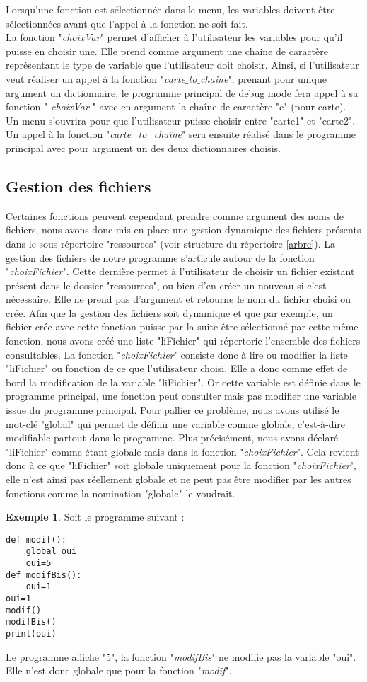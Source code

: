 \documentclass[10pt,a4paper,french,titlepage]{article}
\theoremstyle{definition}
\newtheorem{exmp}{Exemple}
\begin{document}
Lorsqu'une fonction est sélectionnée dans le menu, les variables doivent être sélectionnées avant que l'appel à la fonction ne soit fait.\\ La fonction "\textit{choixVar}" permet d'afficher à l'utilisateur les variables pour qu'il puisse en choisir une. Elle prend comme argument une chaine de caractère représentant le type de variable que l'utilisateur doit choisir. Ainsi, si l'utilisateur veut réaliser un appel à la fonction "\textit{carte$\_$to$\_$chaine}", prenant pour unique argument un dictionnaire, le programme principal de debug$\_$mode fera appel à sa fonction " \textit{choixVar} " avec en argument la chaîne de caractère "c" (pour carte). Un menu s'ouvrira pour que l'utilisateur puisse choisir entre "carte1" et "carte2". Un appel à la fonction "\textit{carte\_to\_chaîne}" sera ensuite réalisé dans le programme principal avec pour argument un des deux dictionnaires choisis.


\subsection{Gestion des fichiers}
Certaines fonctions peuvent cependant prendre comme argument des noms de fichiers, nous avons donc mis en place une gestion dynamique des fichiers présents dans le sous-répertoire "ressources" (voir structure du répertoire \ref{arbre}). La gestion des fichiers de notre programme s'articule autour de la fonction "\textit{choixFichier}". Cette dernière permet à l'utilisateur de choisir un fichier existant présent dans le dossier "ressources", ou bien d'en créer un nouveau si c'est nécessaire. Elle ne prend pas d'argument et retourne le nom du fichier choisi ou crée. Afin que la gestion des fichiers soit dynamique et que par exemple, un fichier crée avec cette fonction puisse par la suite être sélectionné par cette même fonction, nous avons créé une liste "liFichier" qui répertorie l'ensemble des fichiers consultables. La fonction "\textit{choixFichier}" consiste donc à lire ou modifier la liste "liFichier" ou fonction de ce que l'utilisateur choisi. Elle a donc comme effet de bord la modification de la variable "liFichier". Or cette variable est définie dans le programme principal, une fonction peut consulter mais pas modifier une variable issue du programme principal. Pour pallier ce problème, nous avons utilisé le mot-clé "global" qui permet de définir une variable comme globale, c’est-à-dire modifiable partout dans le programme. Plus précisément, nous avons déclaré "liFichier" comme étant globale mais dans la fonction "\textit{choixFichier}". Cela revient donc à ce que "liFichier" soit globale uniquement pour la fonction "\textit{choixFichier}", elle n'est ainsi pas réellement globale et ne peut pas être modifier par les autres fonctions comme la nomination "globale" le voudrait.
\begin{exmp}
Soit le programme suivant :
\begin{lstlisting}
def modif():
    global oui
    oui=5
def modifBis():
    oui=1
oui=1
modif()
modifBis()
print(oui)
\end{lstlisting}
Le programme affiche "5", la fonction "\textit{modifBis}" ne modifie pas la variable "oui". Elle n'est donc globale que pour la fonction "\textit{modif}".
\end{exmp}
\end{document}
